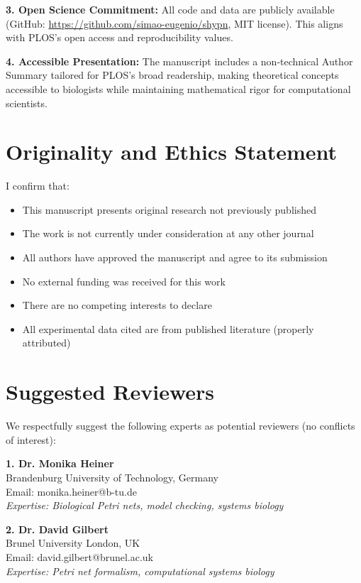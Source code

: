 \documentclass[11pt,letterpaper]{article}
\begin{document}
\textbf{3. Open Science Commitment:} All code and data are publicly available (GitHub: \url{https://github.com/simao-eugenio/shypn}, MIT license). This aligns with PLOS's open access and reproducibility values.

\textbf{4. Accessible Presentation:} The manuscript includes a non-technical Author Summary tailored for PLOS's broad readership, making theoretical concepts accessible to biologists while maintaining mathematical rigor for computational scientists.

\section*{Originality and Ethics Statement}

I confirm that:
\begin{itemize}
\item This manuscript presents original research not previously published
\item The work is not currently under consideration at any other journal
\item All authors have approved the manuscript and agree to its submission
\item No external funding was received for this work
\item There are no competing interests to declare
\item All experimental data cited are from published literature (properly attributed)
\end{itemize}

\section*{Suggested Reviewers}

We respectfully suggest the following experts as potential reviewers (no conflicts of interest):

\textbf{1. Dr. Monika Heiner}\\
Brandenburg University of Technology, Germany\\
Email: monika.heiner@b-tu.de\\
\textit{Expertise: Biological Petri nets, model checking, systems biology}

\textbf{2. Dr. David Gilbert}\\
Brunel University London, UK\\
Email: david.gilbert@brunel.ac.uk\\
\textit{Expertise: Petri net formalism, computational systems biology}
\end{document}
